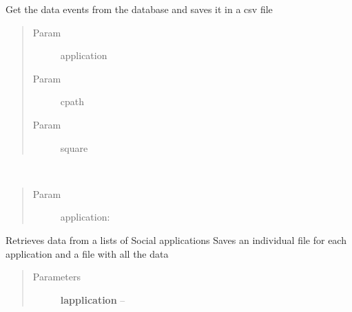 \documentclass[letterpaper,10pt,english]{sphinxmanual}
\begin{document}
\begin{fulllineitems}
\label{index:SuperHub.DB.getApplicationData}
Get the data events from the database and saves it in a csv file
\begin{quote}\begin{description}
\item[{Param }] \leavevmode
application

\item[{Param }] \leavevmode
cpath

\item[{Param }] \leavevmode
square

\end{description}\end{quote}

\end{fulllineitems}


\begin{fulllineitems}
\label{index:SuperHub.DB.getApplicationDataOne}~\begin{quote}\begin{description}
\item[{Param }] \leavevmode
application:

\end{description}\end{quote}

\end{fulllineitems}


\begin{fulllineitems}
\label{index:SuperHub.DB.getLApplicationData}
Retrieves data from a lists of Social applications
Saves an individual file for each application
and a file with all the data
\begin{quote}\begin{description}
\item[{Parameters}] \leavevmode
\textbf{lapplication} -- 

\end{description}\end{quote}

\end{fulllineitems}
\end{document}

